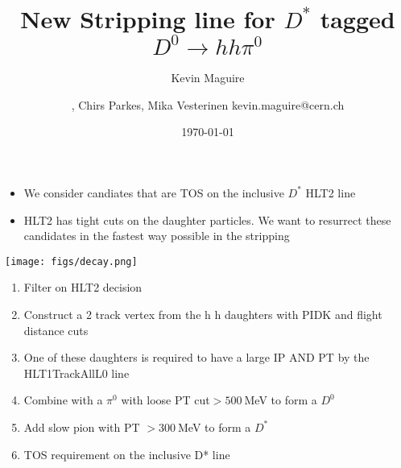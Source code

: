 \documentclass[10pt,a4paper]{beamer}
\author{Kevin Maguire}
\begin{document}
\begin{frame}
\title{New Stripping line for $D^{*}$ tagged $D^{0} \rightarrow h h \pi^{0}$}
\author{, \newline Chirs Parkes, \newline  Mika Vesterinen \newline \newline \newline kevin.maguire@cern.ch}
\date{\today}
\maketitle
{}
\end{frame}

\begin{frame}

\begin{minipage}{5.25cm}
\vspace{1.5em}
\begin{itemize}
\item{We consider candiates that are TOS on the inclusive $D^{*}$ HLT2 line}
\item{HLT2 has tight cuts on the daughter particles. We want to resurrect these candidates in the fastest way possible in the stripping}
\end{itemize}
\begin{center}
\texttt{[image: figs/decay.png]}
\end{center}
\end{minipage}
\hspace{2.0em}
\begin{minipage}{5.25cm}
\begin{enumerate}
\item{Filter on HLT2 decision}
\item{Construct a 2 track vertex from the h h daughters with PIDK and flight distance cuts}
\item{One of these daughters is required to have a large IP AND PT by the HLT1TrackAllL0 line}
\item{Combine with a $\pi^{0}$ with loose PT cut$ > 500~$MeV to form a $D^{0}$}
\item{Add slow pion with PT $> 300~$MeV to form a $D^{*}$}

\item{TOS requirement on the inclusive D* line}
\end{enumerate}
\end{minipage}
\end{frame}
\end{document}
